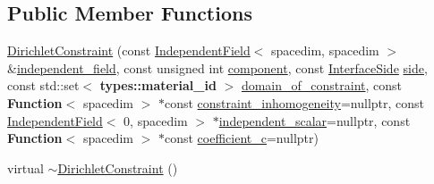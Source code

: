 \subsection*{Public Member Functions}
\begin{DoxyCompactItemize}
\item 
\hyperlink{class_dirichlet_constraint_a14e75a7f8bcc8a18daa04a5c1164fe87}{Dirichlet\+Constraint} (const \hyperlink{class_independent_field}{Independent\+Field}$<$ spacedim, spacedim $>$ \&\hyperlink{class_dirichlet_constraint_abbd7945a973ed93d1d773307393ffde3}{independent\+\_\+field}, const unsigned int \hyperlink{class_dirichlet_constraint_a7e3c4d0e0906af1c81b88e05e41bdafc}{component}, const \hyperlink{triangulation__system_8h_a44f3c00e36c1d6e3c389ae693c09b435}{Interface\+Side} \hyperlink{class_dirichlet_constraint_ae049d107664d3bf23d287ec77545b6f3}{side}, const std\+::set$<$ {\bf types\+::material\+\_\+id} $>$ \hyperlink{class_dirichlet_constraint_a258b6ff11b206f966bb03943bb11f469}{domain\+\_\+of\+\_\+constraint}, const {\bf Function}$<$ spacedim $>$ $\ast$const \hyperlink{class_dirichlet_constraint_af22d2bca23999bdb4f2b67e8982d29c5}{constraint\+\_\+inhomogeneity}=nullptr, const \hyperlink{class_independent_field}{Independent\+Field}$<$ 0, spacedim $>$ $\ast$\hyperlink{class_dirichlet_constraint_a8793f0d41a9c6e88638d7cf5d52a6fdd}{independent\+\_\+scalar}=nullptr, const {\bf Function}$<$ spacedim $>$ $\ast$const \hyperlink{class_dirichlet_constraint_adea2dc6126a633b297eb7dfce832b9ef}{coefficient\+\_\+c}=nullptr)
\item 
virtual \hyperlink{class_dirichlet_constraint_ac6b6b7caf4694000486abff377fd1440}{$\sim$\+Dirichlet\+Constraint} ()
\end{DoxyCompactItemize}
